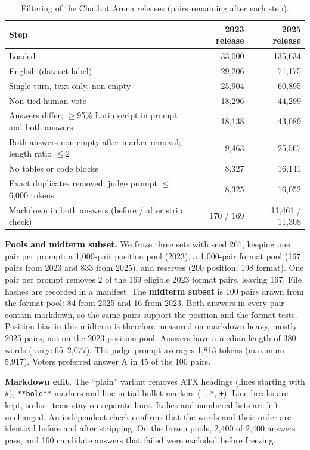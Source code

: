 \documentclass[10pt]{article}
\begin{document}
\begin{table}[H]
\centering\small
\caption{Filtering of the Chatbot Arena releases (pairs remaining after each step).}
\label{tab:filters}
\begin{tabular}{lrr}
\toprule
Step & 2023 release & 2025 release \\
\midrule
Loaded & 33{,}000 & 135{,}634 \\
English (dataset label) & 29{,}206 & 71{,}175 \\
Single turn, text only, non-empty & 25{,}904 & 60{,}895 \\
Non-tied human vote & 18{,}296 & 44{,}299 \\
Answers differ; $\geq$95\% Latin script in prompt and both answers & 18{,}138 & 43{,}089 \\
Both answers non-empty after marker removal; length ratio $\leq 2$ & 9{,}463 & 25{,}567 \\
No tables or code blocks & 8{,}327 & 16{,}141 \\
Exact duplicates removed; judge prompt $\leq$ 6{,}000 tokens & 8{,}325 & 16{,}052 \\
\midrule
Markdown in both answers (before / after strip check) & 170 / 169 & 11{,}461 / 11{,}308 \\
\bottomrule
\end{tabular}
\end{table}

\textbf{Pools and midterm subset.} We froze three sets with seed 261, keeping one pair per prompt: a
1{,}000-pair position pool (2023), a 1{,}000-pair format pool (167 pairs from 2023 and 833 from 2025), and
reserves (200 position, 198 format). One pair per prompt removes 2 of the 169 eligible 2023 format pairs,
leaving 167. File hashes are recorded in a manifest. The \textbf{midterm subset} is
100 pairs drawn from the format pool: 84 from 2025 and 16 from 2023. Both answers in every pair contain markdown,
so the same pairs support the position and the format tests. Position bias in this midterm is therefore measured
on markdown-heavy, mostly 2025 pairs, not on the 2023 position pool. Answers have a median length of 380 words
(range 65--2{,}077). The judge prompt averages 1{,}813 tokens (maximum 5{,}917). Voters preferred answer A in 45
of the 100 pairs.

\textbf{Markdown edit.} The ``plain'' variant removes ATX headings (lines starting with \texttt{\#}),
\texttt{**bold**} markers and line-initial bullet markers (\texttt{-}, \texttt{*}, \texttt{+}). Line breaks are
kept, so list items stay on separate lines. Italics and numbered lists are left unchanged. An independent check
confirms that the words and their order are identical before and after stripping. On the frozen pools,
2{,}400 of 2{,}400 answers pass, and 160 candidate answers that failed were excluded before freezing.
\end{document}

